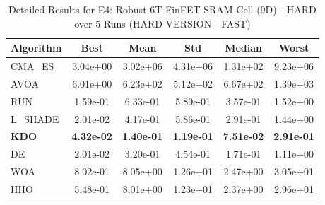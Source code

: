 \begin{table}[htbp]
\centering
\caption{Detailed Results for E4: Robust 6T FinFET SRAM Cell (9D) - HARD over 5 Runs (HARD VERSION - FAST)}
\label{tab:P4_detailed}
\small
\begin{tabular}{lccccc}
\toprule
\textbf{Algorithm} & \textbf{Best} & \textbf{Mean} & \textbf{Std} & \textbf{Median} & \textbf{Worst} \\
\midrule
CMA_ES & 3.04e+00 & 3.02e+06 & 4.31e+06 & 1.31e+02 & 9.23e+06 \\
AVOA & 6.01e+00 & 6.23e+02 & 5.12e+02 & 6.67e+02 & 1.39e+03 \\
RUN & 1.59e-01 & 6.33e-01 & 5.89e-01 & 3.57e-01 & 1.52e+00 \\
L_SHADE & 2.01e-02 & 4.17e-01 & 5.86e-01 & 2.91e-01 & 1.44e+00 \\
\textbf{KDO} & \textbf{4.32e-02} & \textbf{1.40e-01} & \textbf{1.19e-01} & \textbf{7.51e-02} & \textbf{2.91e-01} \\
DE & 2.01e-02 & 3.20e-01 & 4.54e-01 & 1.71e-01 & 1.11e+00 \\
WOA & 8.02e-01 & 8.05e+00 & 1.26e+01 & 2.47e+00 & 3.05e+01 \\
HHO & 5.48e-01 & 8.01e+00 & 1.23e+01 & 2.37e+00 & 2.96e+01 \\
\bottomrule
\end{tabular}
\end{table}
